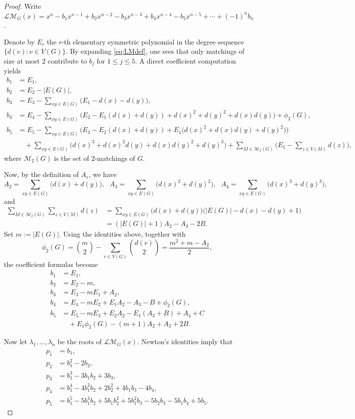 \documentclass[10pt,a4paper]{amsart}
\newcommand{\LM}{\mathscr{LM}}
\newcommand{\calM}{\mathcal{M}}
\begin{document}
\begin{proof}
Write $\LM_G(x)=x^n-b_1x^{n-1}+b_2x^{n-2}-b_3x^{n-3}+b_4x^{n-4}-b_5x^{n-5}+\cdots +(-1)^nb_n$.

Denote by $E_r$ the $r$-th elementary symmetric polynomial in the degree sequence \\
$\{d(v):v\in V(G)\}$. By expanding \eqref{eq:LMdef}, one sees that only matchings of 
size at most $2$ contribute to $b_j$ for $1\le j\le 5$. A direct coefficient computation yields
\begin{align*}
b_1 &= E_1,\\
b_2 &= E_2-|E(G)|,\\ 
b_3 &= E_3-\sum_{xy\in E(G)} \bigl(E_1-d(x)-d(y)\bigr),\\
b_4 & = E_4-\sum_{xy\in E(G)}\bigl(E_2-E_1(d(x)+d(y))
+d(x)^2+d(y)^2+d(x)d(y)\bigr) + \phi_2(G), \\
b_5 & = E_5-\sum_{xy\in E(G)} \!\bigl(E_3-E_2(d(x)+d(y))
+E_1\bigl(d(x)^2+d(x)d(y)+d(y)^2\bigr)\bigr) \\
& \quad+\sum_{xy\in E(G)}\! \bigl(d(x)^3+d(x)^2d(y)+d(x)d(y)^2+d(y)^3\bigr) 
+\sum_{M\in \calM_2(G)}\!\! \bigg(E_1-\sum_{z\in V(M)} d(z)\bigg),
\end{align*}
where $\calM_2(G)$ is the set of $2$-matchings of $G$.

Now, by the definition of $A_r$, we have
\[
A_2 = \sum_{xy\in E(G)}\! \bigl(d(x)+d(y)\bigr),~~~ 
A_3 = \sum_{xy\in E(G)}\! \bigl(d(x)^2+d(y)^2\bigr),~~~
A_4 = \sum_{xy\in E(G)}\! \bigl(d(x)^3+d(y)^3\bigr), 
\]
and
\begin{align*}
\sum_{M\in \calM_2(G)} \sum_{z\in V(M)} d(z)
& = \sum_{xy\in E(G)} \bigl(d(x) + d(y)\bigr) \bigl(|E(G)|-d(x)-d(y)+1\bigr) \\
& = (|E(G)|+1) A_2 - A_3 - 2B.
\end{align*}
Set $m:=|E(G)|$. Using the identities above, together with
\[
\phi_2(G)=\binom{m}{2}-\sum_{v\in V(G)}\binom{d(v)}{2}
=\frac{m^2+m-A_2}{2},
\]
the coefficient formulas become 
\begin{align*}
b_1 &= E_1,\\ 
b_2 &=E_2-m,\\ 
b_3 &=E_3-mE_1+A_2,\\
b_4 & = E_4-mE_2+E_1A_2-A_3-B+\phi_2(G), \\
b_5 & = E_5-mE_3+E_2A_2-E_1(A_3+B)+A_4+C \\
& \quad +E_1\phi_2(G)-(m+1)A_2+A_3+2B.
\end{align*}

Now let $\lambda_1,\dots,\lambda_n$ be the roots of $\LM_G(x)$. 
Newton's identities imply that
\begin{align*}
p_1 &= b_1,\\ 
p_2 &=b_1^2-2b_2,\\ 
p_3 &=b_1^3-3b_1b_2+3b_3,\\
p_4 & = b_1^4-4b_1^2b_2+2b_2^2+4b_1b_3-4b_4, \\
p_5 & = b_1^5-5b_1^3b_2+5b_1b_2^2+5b_1^2b_3-5b_2b_3-5b_1b_4+5b_5.
\end{align*}


\end{proof}
\end{document}
